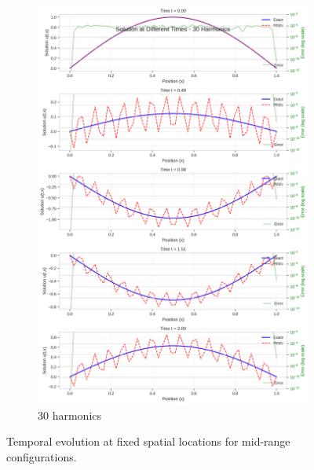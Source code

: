 \begin{figure}[H]
\begin{subfigure}[b]{0.32\textwidth}
        \includegraphics[width=\textwidth]{figures/time_slices_30h.png}
        \caption{30 harmonics}
    \end{subfigure}
    \caption{Temporal evolution at fixed spatial locations for mid-range configurations.}
    \label{fig:time_slices_mid}
\end{figure}


